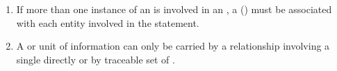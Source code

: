 \begin{enumerate}
\item If more than one instance of an  is involved in an , a   () must be associated with each entity involved in the statement.
\item A  or  unit of information can only be carried by a relationship involving a single  directly or by traceable set of .
\end{enumerate}  


